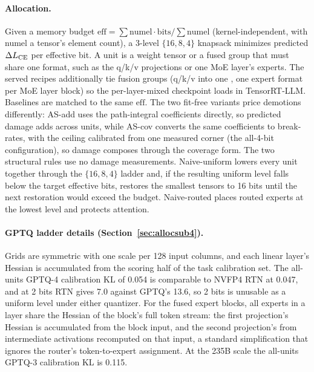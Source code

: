 \paragraph{Allocation.} Given a memory budget
$\mathrm{eff} = \sum \mathrm{numel}\cdot\mathrm{bits} / \sum \mathrm{numel}$ (kernel-independent, with
numel a tensor's element count), a
3-level $\{16,8,4\}$ knapsack minimizes predicted $\Delta L_{\mathrm{CE}}$ per effective bit. A unit is a weight tensor
or a fused group that must share one format, such as the q/k/v projections or one MoE layer's experts.
The served recipes
additionally tie fusion groups (q/k/v into one , one expert format per MoE layer block) so
the per-layer-mixed checkpoint loads in TensorRT-LLM. Baselines are matched to the same $\mathrm{eff}$.
The two fit-free variants price demotions differently: AS-add uses the path-integral coefficients
directly, so predicted damage adds across units, while AS-cov converts the same coefficients to
break-rates, with the ceiling calibrated from one measured corner (the all-4-bit configuration), so
damage composes through the coverage form. The two structural rules use no damage measurements.
Naive-uniform lowers every unit together through the $\{16,8,4\}$ ladder and, if the resulting uniform
level falls below the target effective bits, restores the smallest tensors to 16 bits until the next
restoration would exceed the budget. Naive-routed places routed experts at the lowest level and protects
attention.




\paragraph{GPTQ ladder details (Section~\ref{sec:allocsub4}).} Grids are symmetric with one scale per
128 input columns, and each linear layer's Hessian is accumulated from the scoring half of the task
calibration set. The all-units GPTQ-4 calibration KL of 0.054 is comparable to NVFP4 RTN at 0.047, and
at 2 bits RTN gives 7.0 against GPTQ's 13.6, so 2 bits is unusable as a uniform level under either
quantizer. For the fused expert blocks, all experts
in a layer share the Hessian of the block's full token stream: the first projection's Hessian is
accumulated from the block input, and the second projection's from intermediate activations recomputed
on that input, a standard simplification that ignores the router's token-to-expert assignment. At the
235B scale the all-units GPTQ-3 calibration KL is 0.115.


